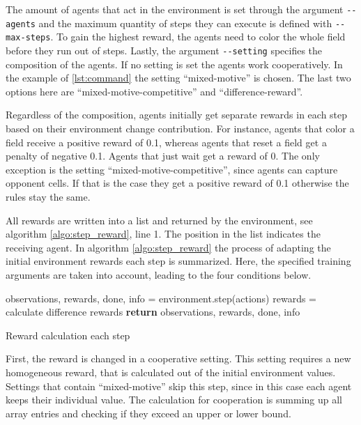 The amount of agents that act in the environment is set through the argument \verb|--agents| and the maximum quantity of steps they can execute is defined with \verb|--max-steps|. To gain the highest reward, the agents need to color the whole field before they run out of steps. Lastly, the argument \verb|--setting| specifies the composition of the agents. If no setting is set the agents work cooperatively. In the example of \ref{lst:command} the setting ``mixed-motive'' is chosen. The last two options here are ``mixed-motive-competitive'' and ``difference-reward''. %

Regardless of the composition, agents initially get separate rewards in each step based on their environment change contribution. For instance, agents that color a field receive a positive reward of 0.1, whereas agents that reset a field get a penalty of negative 0.1. Agents that just wait get a reward of 0. The only exception is the setting ``mixed-motive-competitive'', since agents can capture opponent cells. If that is the case they get a positive reward of 0.1 otherwise the rules stay the same. 

All rewards are written into a list and returned by the environment, see algorithm \ref{algo:step_reward}, line 1. The position in the list indicates the receiving agent. In algorithm \ref{algo:step_reward} the process of adapting the initial environment rewards each step is summarized. Here, the specified training arguments are taken into account, leading to the four conditions below.

\begin{algorithm}[H]
    \DontPrintSemicolon
    observations, rewards, done, info = environment.step(actions)\;
     {
        rewards = calculate difference rewards
    }
    \textbf{return} observations, rewards, done, info\;
    \caption{Reward calculation each step}\label{algo:step_reward}
\end{algorithm}

First, the reward is changed in a cooperative setting. This setting requires a new homogeneous reward, that is calculated out of the initial environment values. Settings that contain ``mixed-motive'' skip this step, since in this case each agent keeps their individual value. The calculation for cooperation is summing up all array entries and checking if they exceed an upper or lower bound. 

